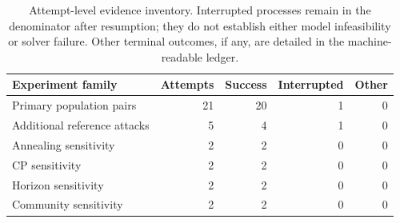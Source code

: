 \begin{table}[tb]\centering\small
\caption{Attempt-level evidence inventory. Interrupted processes remain in the denominator after resumption; they do not establish either model infeasibility or solver failure. Other terminal outcomes, if any, are detailed in the machine-readable ledger.}\label{tab:ledger}
\begin{tabular}{@{}lrrrr@{}}\toprule
Experiment family & Attempts & Success & Interrupted & Other \\ \midrule
Primary population pairs & 21 & 20 & 1 & 0 \\
Additional reference attacks & 5 & 4 & 1 & 0 \\
Annealing sensitivity & 2 & 2 & 0 & 0 \\
CP sensitivity & 2 & 2 & 0 & 0 \\
Horizon sensitivity & 2 & 2 & 0 & 0 \\
Community sensitivity & 2 & 2 & 0 & 0 \\
\bottomrule\end{tabular}\end{table}

